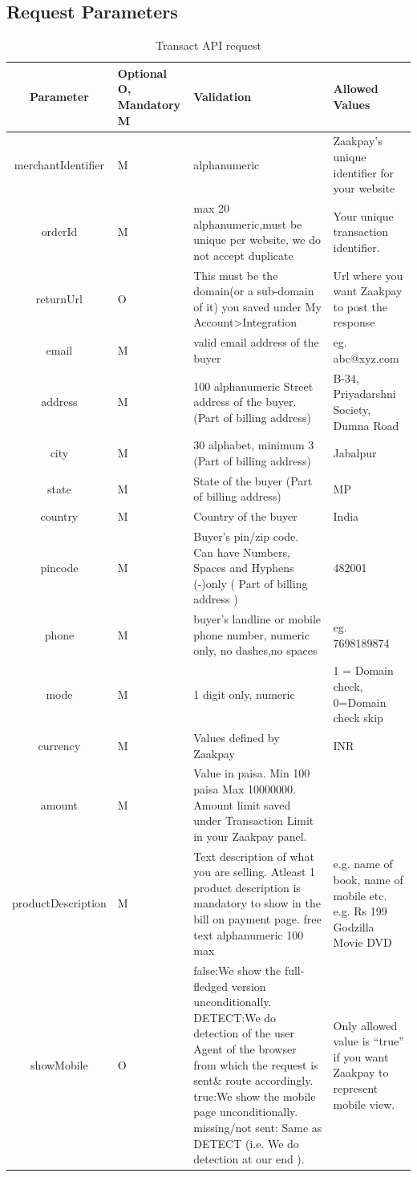 \documentclass{article}
\begin{document}
\subsection{Request Parameters}
\begin{longtable}{||c|| p{2.09cm}|| p{5.5cm}| p{4.7cm}||}
\caption{Transact API request}\\
\rowcolor{green!50}
\bfseries{Parameter} & \bfseries{Optional O, Mandatory M} & \bfseries{Validation} & \bfseries{Allowed Values} \\ \hline
merchantIdentifier & M & alphanumeric & Zaakpay's unique identifier for your website \\
orderId & M & max 20 alphanumeric,must be unique per website, we do not accept duplicate & Your unique transaction identifier. \\
returnUrl & O & This must be the domain(or a sub-domain of it) you saved under My Account>Integration & Url where you want Zaakpay to post the response \\
email & M & valid email address of the buyer & eg. abc@xyz.com \\
address & M & 100 alphanumeric Street address of the buyer. (Part of billing address) & B-34, Priyadarshni Society, Dumna Road \\
city & M & 30 alphabet, minimum 3 (Part of billing address) & Jabalpur \\
state & M & State of the buyer (Part of billing address) & MP \\
country & M & Country of the buyer & India\\
pincode & M & Buyer's pin/zip code. Can have Numbers, Spaces and Hyphens (-)only ( Part of billing address ) & 482001 \\
phone & M & buyer's landline or mobile phone number, numeric only, no dashes,no spaces & eg. 7698189874 \\
mode & M & 1 digit only, numeric & 1 = Domain check, 0=Domain check skip\\
currency & M & Values defined by Zaakpay & INR\\
amount & M & Value in paisa. Min 100 paisa Max 10000000. Amount limit saved under Transaction Limit in your Zaakpay panel. & \\
productDescription & M & Text description of what you are selling. Atleast 1 product description is mandatory to show in the bill on payment page. free text alphanumeric 100 max & e.g. name of book, name of mobile etc. e.g. Rs 199 Godzilla Movie DVD \\
showMobile & O & false:We show the full-fledged version unconditionally. DETECT:We do detection of the user Agent of the browser from which the request is sent\& route accordingly. true:We show the mobile page unconditionally. missing/not sent: Same as DETECT (i.e. We do detection at our end ). & Only allowed value is “true” if you want Zaakpay to represent mobile view.\\

\end{longtable}
\end{document}
